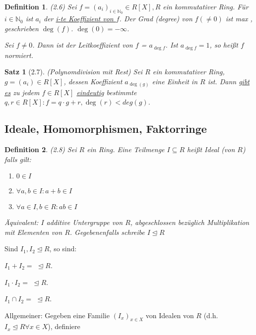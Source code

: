 \documentclass[10pt,a4paper]{article}
\newtheorem{defi}{Definition}
\newtheorem{satz}{Satz}
\begin{document}
\begin{defi}(2.6)
Sei $f = (a_i)_{i \in \mathbb{N}_0} \in R[X], R$ ein kommutativer Ring. Für $i \in \mathbb{N}_0$ ist $a_i$ der \underline{i-te Koeffizient von $f$}. Der \emph{Grad} (\glqq degree\grqq) von $f (\neq 0)$ ist max , geschrieben $\deg (f)$. $\deg(0) = - \infty$.

Sei $f \neq 0$. Dann ist der Leitkoeffizient von $f$ = $a_{\deg f}$. Ist $a_{\deg f} = 1$, so heißt $f$ \emph{normiert}.  
\end{defi}

\begin{satz}[2.7] (Polynomdivision mit Rest)
Sei $R$ ein kommutativer Ring, $g = (a_i) \in R[X]$, dessen Koeffizient $a_{\deg(g)}$ eine Einheit in $R$ ist. Dann \underline{gibt es} zu jedem $f \in R[X]$ \underline{eindeutig} bestimmte $q, r \in R[X]: f = q \cdot g + r, \deg(r) < deg(g)$.
\end{satz}

\subsection{Ideale, Homomorphismen, Faktorringe}

\begin{defi}(2.8)
Sei $R$ ein Ring. Eine Teilmenge $I \subseteq R$ heißt \emph{Ideal (von $R$)} falls gilt:
\begin{enumerate}
\item $0 \in I$
\item $\forall a, b \in I: a+b \in I$
\item $\forall a \in I, b \in R: ab \in I$
\end{enumerate}
Äquivalent: $I$ additive Untergruppe von $R$, abgeschlossen bezüglich Multiplikation mit Elementen von $R$. Gegebenenfalls schreibe $I \trianglelefteq R$
\end{defi}

Sind $I_1 , I_2 \trianglelefteq R$, so sind:

$I_1 + I_2 = $  $\trianglelefteq R$.

$I_1 \cdot I_2 = $  $\trianglelefteq R$.

$I_1 \cap I_2 = $  $\trianglelefteq R$.

Allgemeiner: Gegeben eine Familie $(I_x)_{x \in X}$ von Idealen von $R$ (d.h. $I_x \trianglelefteq R \forall x \in X$), definiere
\end{document}

